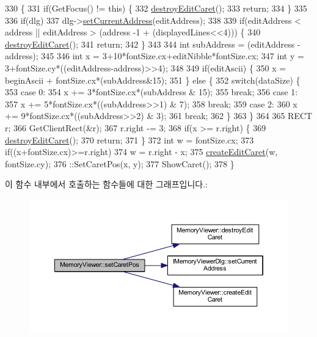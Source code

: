 \begin{DoxyCode}
330 \{
331   \textcolor{keywordflow}{if}(GetFocus() != \textcolor{keyword}{this}) \{
332     \mbox{\hyperlink{class_memory_viewer_ab658d89232d31d190ac4e323d61c4b8f}{destroyEditCaret}}();
333     \textcolor{keywordflow}{return};
334   \}
335 
336   \textcolor{keywordflow}{if}(dlg)
337     dlg->\mbox{\hyperlink{class_i_memory_viewer_dlg_a95cad5a86447abbc593b7154c110bb2c}{setCurrentAddress}}(editAddress);
338   
339   \textcolor{keywordflow}{if}(editAddress < address || editAddress > (address -1 + (displayedLines<<4))) \{
340     \mbox{\hyperlink{class_memory_viewer_ab658d89232d31d190ac4e323d61c4b8f}{destroyEditCaret}}();
341     \textcolor{keywordflow}{return};
342   \}
343 
344   \textcolor{keywordtype}{int} subAddress = (editAddress - address);
345 
346   \textcolor{keywordtype}{int} x = 3+10*fontSize.cx+editNibble*fontSize.cx;
347   \textcolor{keywordtype}{int} y = 3+fontSize.cy*((editAddress-address)>>4);
348 
349   \textcolor{keywordflow}{if}(editAscii) \{
350     x = beginAscii + fontSize.cx*(subAddress&15);
351   \} \textcolor{keywordflow}{else} \{
352     \textcolor{keywordflow}{switch}(dataSize) \{
353     \textcolor{keywordflow}{case} 0:
354       x += 3*fontSize.cx*(subAddress & 15);
355       \textcolor{keywordflow}{break};
356     \textcolor{keywordflow}{case} 1:
357       x += 5*fontSize.cx*((subAddress>>1) & 7);
358       \textcolor{keywordflow}{break};
359     \textcolor{keywordflow}{case} 2:
360       x += 9*fontSize.cx*((subAddress>>2) & 3);
361       \textcolor{keywordflow}{break};
362     \}
363   \}
364 
365   RECT r;
366   GetClientRect(&r);
367   r.right -= 3;
368   \textcolor{keywordflow}{if}(x >= r.right) \{
369     \mbox{\hyperlink{class_memory_viewer_ab658d89232d31d190ac4e323d61c4b8f}{destroyEditCaret}}();
370     \textcolor{keywordflow}{return};
371   \}
372   \textcolor{keywordtype}{int} w = fontSize.cx;
373   \textcolor{keywordflow}{if}((x+fontSize.cx)>=r.right)
374     w = r.right - x;
375   \mbox{\hyperlink{class_memory_viewer_a73ddaf427846eedb7073ad6fc69001ac}{createEditCaret}}(w, fontSize.cy);
376   ::SetCaretPos(x, y);
377   ShowCaret();
378 \}
\end{DoxyCode}
이 함수 내부에서 호출하는 함수들에 대한 그래프입니다.\+:
\nopagebreak
\begin{figure}[H]
\begin{center}
\leavevmode
\includegraphics[width=350pt]{class_memory_viewer_abfed49727a6de1b52e5495ed96816759_cgraph}
\end{center}
\end{figure}
